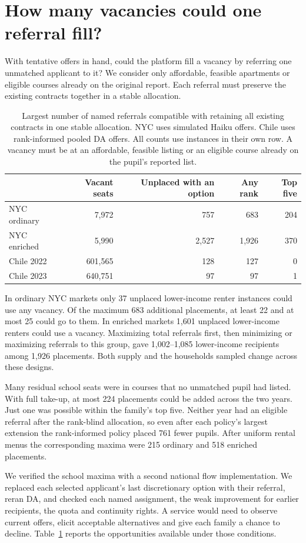 \section{How many vacancies could one referral fill?}\label{sec:remedy}
With tentative offers in hand, could the platform fill a vacancy by referring one unmatched applicant to it? We consider only affordable, feasible apartments or eligible courses already on the original report. Each referral must preserve the existing contracts together in a stable allocation.


\begin{table}[ht]\centering\small
\caption{Largest number of named referrals compatible with retaining all existing contracts in one stable allocation. NYC uses simulated Haiku offers. Chile uses rank-informed pooled DA offers. All counts use instances in their own row. A vacancy must be at an affordable, feasible listing or an eligible course already on the pupil's reported list.}\label{tab:ref}
\begin{tabular}{@{}lrrrr@{}}\toprule
& Vacant seats & Unplaced with an option & Any rank & Top five\\\midrule
NYC ordinary & 7,972 & 757 & 683 & 204\\
NYC enriched & 5,990 & 2,527 & 1,926 & 370\\
Chile 2022 & 601,565 & 128 & 127 & 0\\
Chile 2023 & 640,751 & 97 & 97 & 1\\\bottomrule
\end{tabular}
\end{table}

In ordinary NYC markets only 37 unplaced lower-income renter instances could use any vacancy. Of the maximum 683 additional placements, at least 22 and at most 25 could go to them. In enriched markets 1,601 unplaced lower-income renters could use a vacancy. Maximizing total referrals first, then minimizing or maximizing referrals to this group, gave 1,002--1,085 lower-income recipients among 1,926 placements. Both supply and the households sampled change across these designs.

Many residual school seats were in courses that no unmatched pupil had listed. With full take-up, at most 224 placements could be added across the two years. Just one was possible within the family's top five. Neither year had an eligible referral after the rank-blind allocation, so even after each policy's largest extension the rank-informed policy placed 761 fewer pupils. After uniform rental menus the corresponding maxima were 215 ordinary and 518 enriched placements.

We verified the school maxima with a second national flow implementation. We replaced each selected applicant's last discretionary option with their referral, reran DA, and checked each named assignment, the weak improvement for earlier recipients, the quota and continuity rights. A service would need to observe current offers, elicit acceptable alternatives and give each family a chance to decline. Table~\ref{tab:ref} reports the opportunities available under those conditions.

